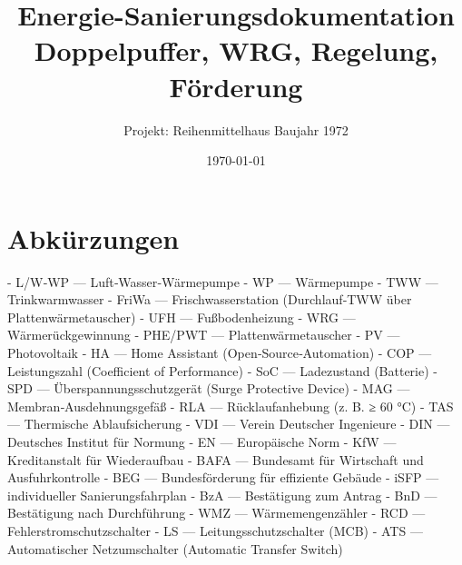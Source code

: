\documentclass[11pt,oneside]{report}
\title{Energie-Sanierungsdokumentation\\Doppelpuffer, WRG, Regelung, Förderung}
\author{Projekt: Reihenmittelhaus Baujahr 1972}
\date{\today}
\begin{document}
\maketitle
\setcounter{secnumdepth}{3}
\setcounter{tocdepth}{3}
\tableofcontents
\clearpage

\chapter{Abkürzungen}
\begin{markdown}
- L/W‑WP — Luft‑Wasser‑Wärmepumpe
- WP — Wärmepumpe
- TWW — Trinkwarmwasser
- FriWa — Frischwasserstation (Durchlauf‑TWW über Plattenwärmetauscher)
- UFH — Fußbodenheizung
- WRG — Wärmerückgewinnung
- PHE/PWT — Plattenwärmetauscher
- PV — Photovoltaik
- HA — Home Assistant (Open‑Source‑Automation)
- COP — Leistungszahl (Coefficient of Performance)
- SoC — Ladezustand (Batterie)
- SPD — Überspannungsschutzgerät (Surge Protective Device)
- MAG — Membran‑Ausdehnungsgefäß
- RLA — Rücklaufanhebung (z. B. ≥ 60 °C)
- TAS — Thermische Ablaufsicherung
- VDI — Verein Deutscher Ingenieure
- DIN — Deutsches Institut für Normung
- EN — Europäische Norm
- KfW — Kreditanstalt für Wiederaufbau
- BAFA — Bundesamt für Wirtschaft und Ausfuhrkontrolle
- BEG — Bundesförderung für effiziente Gebäude
- iSFP — individueller Sanierungsfahrplan
- BzA — Bestätigung zum Antrag
- BnD — Bestätigung nach Durchführung
- WMZ — Wärmemengenzähler
- RCD — Fehlerstromschutzschalter
- LS — Leitungsschutzschalter (MCB)
- ATS — Automatischer Netzumschalter (Automatic Transfer Switch)
\end{markdown}
\end{document}
